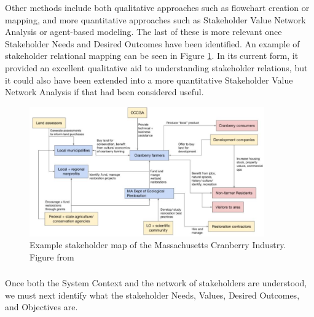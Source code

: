 Other methods include both qualitative approaches such as flowchart creation or mapping, and more quantitative approaches such as Stakeholder Value Network Analysis \cite{fengDependencyStructureMatrix2010a} or agent-based modeling. The last of these is more relevant once Stakeholder Needs and Desired Outcomes have been identified. An example of stakeholder relational mapping can be seen in Figure \ref{fig:jaffe-stakeholder}. In its current form, it provided an excellent qualitative aid to understanding stakeholder relations, but it could also have been extended into a more quantitative Stakeholder Value Network Analysis if that had been considered useful.

\begin{figure}[!htb] 
\centering
\includegraphics[width=0.9\textwidth]{Figures/chap3/jaffe-stakeholder.png}
\caption[Example stakeholder map of the Massachusetts Cranberry Industry]{Example stakeholder map of the Massachusetts Cranberry Industry. Figure from \cite{jaffeEnvironmentalEconomicSystems2022}}
\label{fig:jaffe-stakeholder}
\end{figure}

\subsubsection{}

Once both the System Context and the network of stakeholders are understood, we must next identify what the stakeholder Needs, Values, Desired Outcomes, and Objectives are.

